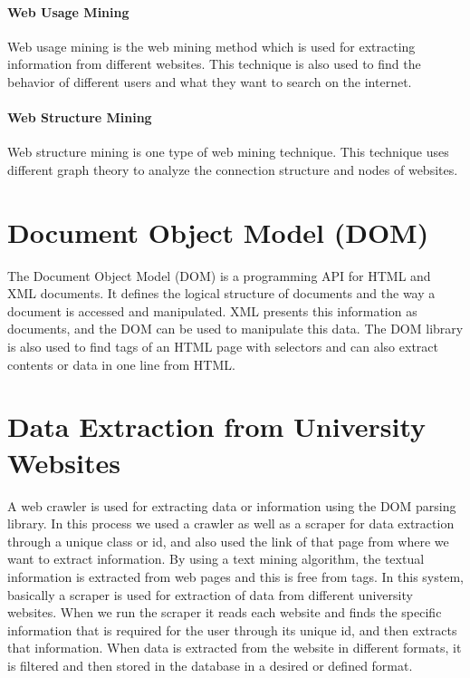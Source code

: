\paragraph{Web Usage Mining}

Web usage mining is the web mining method which is used for extracting information from different websites. This technique is also used to find the behavior of different users and what they want to search on the internet.

\paragraph{Web Structure Mining}

Web structure mining is one type of web mining technique. This technique uses different graph theory to analyze the connection structure and nodes of websites.

\section{Document Object Model (DOM)}

The Document Object Model (DOM) is a programming API for HTML and XML documents. It defines the logical structure of documents and the way a document is accessed and manipulated. XML presents this information as documents, and the DOM can be used to manipulate this data. The DOM library is also used to find tags of an HTML page with selectors and can also extract contents or data in one line from HTML.

\section{Data Extraction from University Websites}

A web crawler is used for extracting data or information using the DOM parsing library. In this process we used a crawler as well as a scraper for data extraction through a unique class or id, and also used the link of that page from where we want to extract information. By using a text mining algorithm, the textual information is extracted from web pages and this is free from tags. In this system, basically a scraper is used for extraction of data from different university websites. When we run the scraper it reads each website and finds the specific information that is required for the user through its unique id, and then extracts that information. When data is extracted from the website in different formats, it is filtered and then stored in the database in a desired or defined format.

